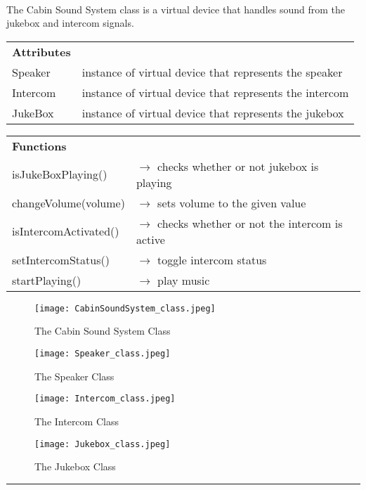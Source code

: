 \documentclass[12pt]{article}
\begin{document}
	\paragraph{} The Cabin Sound System class is a virtual device that handles sound from the jukebox and intercom signals. 
	\begin{table}[H]
		\begin{tabular}{lp{12cm}}
			\textbf{Attributes} & \\ 
			Speaker   & instance of virtual device that represents the speaker \\
		   	Intercom  & instance of virtual device that represents the intercom \\
			JukeBox   & instance of virtual device that represents the jukebox \\
		\end{tabular}
	\end{table}     
	\begin{table}[H]
		\begin{tabular}{lp{12cm}}
			\textbf{Functions}      & \\
			isJukeBoxPlaying()      & $\rightarrow$ checks whether or not jukebox is playing\\
			changeVolume(volume)    & $\rightarrow$ sets volume to the given value\\
			isIntercomActivated() 	& $\rightarrow$ checks whether or not the intercom is active\\
			setIntercomStatus() 	& $\rightarrow$ toggle intercom status\\
			startPlaying()			& $\rightarrow$ play music\\
		\end{tabular}
	\end{table}
    \begin{figure}[H]
  		\centerline{\texttt{[image: CabinSoundSystem\_class.jpeg]}}
  		\caption{The Cabin Sound System Class}
  		\label{fig:CabinSoundSystem_class}
	\end{figure}
    \begin{figure}[H]
  		\centerline{\texttt{[image: Speaker\_class.jpeg]}}
  		\caption{The Speaker Class}
  		\label{fig:Speaker_class}
	\end{figure}
    \begin{figure}[H]
  		\centerline{\texttt{[image: Intercom\_class.jpeg]}}
  		\caption{The Intercom Class}
  		\label{fig:Intercom_class}
	\end{figure}
    \begin{figure}[H]
  		\centerline{\texttt{[image: Jukebox\_class.jpeg]}}
  		\caption{The Jukebox Class}
  		\label{fig:Jukebox_class}
	\end{figure}
	\par\noindent\rule{\textwidth}{0.4pt}
\end{document}
